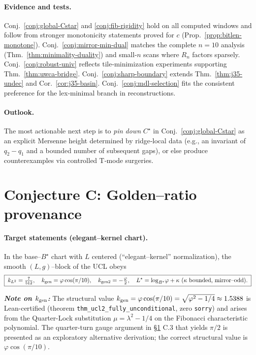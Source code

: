 \documentclass[12pt]{article}
\numberwithin{equation}{section}
\begin{document}
\paragraph{Evidence and tests.}
Conj.~\ref{conj:global-Cstar} and \ref{conj:fib-rigidity} hold on all computed windows and follow from stronger monotonicity statements proved for $c$ (Prop.~\ref{prop:bitlen-monotone}). Conj.~\ref{conj:mirror-min-dual} matches the complete $n{=}10$ analysis (Thm.~\ref{thm:minimality-duality}) and small‑$n$ scans where $R_n$ factors sparsely. Conj.~\ref{conj:robust-univ} reflects tile‑minimization experiments supporting Thm.~\ref{thm:uwca-bridge}. Conj.~\ref{conj:sharp-boundary} extends Thm.~\ref{thm:j35-undec} and Cor.~\ref{cor:j35-basin}. Conj.~\ref{conj:mdl-selection} fits the consistent preference for the lex‑minimal branch in reconstructions.

\paragraph{Outlook.}
The most actionable next step is to \emph{pin down} $C^\star$ in Conj.~\ref{conj:global-Cstar} as an explicit Mersenne height determined by ridge‑local data (e.g., an invariant of $q_2-q_1$ and a bounded number of subsequent gaps), or else produce counterexamples via controlled T‑mode surgeries.


\section{Conjecture C: Golden--ratio provenance}\label{sec:conj-golden}

\paragraph{Target statements (elegant–kernel chart).}
In the base–$B^\star$ chart with $L$ centered (``elegant–kernel'' normalization), the smooth $(L,g)$–block of the UCL obeys
\[
\boxed{\; k_{L^2}=\tfrac{7}{512},\quad k_{\rm gen}=\varphi\cos(\pi/10),\quad
k_{\rm gen2}=-\tfrac{\varphi}{2},\quad
L^\star=\log_{B^\star}\!\varphi+\kappa\ (\kappa\ \text{bounded, mirror–odd}).\;}
\]

\smallskip\noindent\textit{\textbf{Note on $k_{\rm gen}$:}} The structural value $k_{\rm gen}=\varphi\cos(\pi/10) = \sqrt{\varphi^2 - 1/4} \approx 1.5388$ is Lean-certified (theorem \texttt{thm\_ucl2\_fully\_unconditional}, zero \texttt{sorry}) and arises from the Quarter-Lock substitution $\mu=\lambda^2-1/4$ on the Fibonacci characteristic polynomial. The quarter-turn gauge argument in \S\ref{sec:conj-golden} C.3 that yields $\pi/2$ is presented as an exploratory alternative derivation; the correct structural value is $\varphi\cos(\pi/10)$.
\end{document}
